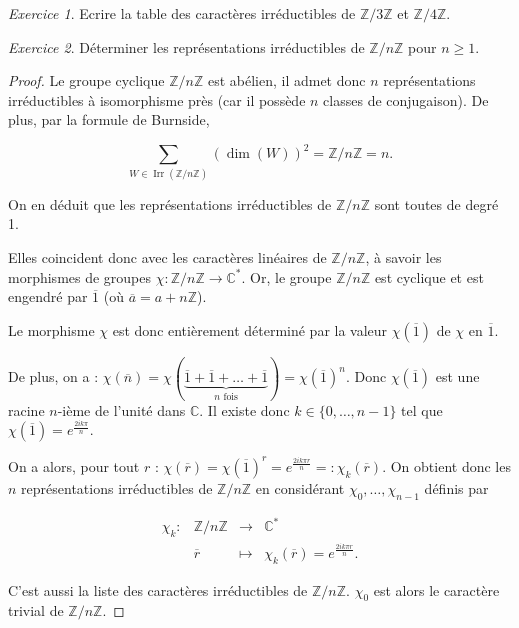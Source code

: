 \documentclass[french]{book}
\theoremstyle{definition}
\theoremstyle{remark}
\newtheorem{exo}{Exercice}
\begin{document}
\begin{exo}
  Ecrire la table des caractères irréductibles de \(\mathbb{Z}/{ 3 }\mathbb{Z}\) et \(\mathbb{Z}/{ 4 }\mathbb{Z}\).
\end{exo}

\begin{exo}
  Déterminer les représentations irréductibles de \(\mathbb{Z}/{n}\mathbb{Z}\) pour \(n \geq 1\).
\end{exo}

\begin{proof}
  Le groupe cyclique \(\mathbb{Z}/{ n }\mathbb{Z}\) est abélien, il admet donc \(n\) représentations irréductibles à isomorphisme près (car il possède \(n\) classes de conjugaison). De plus, par la formule de Burnside,

  \[\sum_{W \in \operatorname{Irr}(\mathbb{Z}/{ n }\mathbb{Z})} (\operatorname{dim}(W)) ^2 = \mathbb{Z}/{ n }\mathbb{Z} = n.\]

  On en déduit que les représentations irréductibles de \(\mathbb{Z}/{ n }\mathbb{Z}\) sont toutes de degré 1.

  Elles coincident donc avec les caractères linéaires de \(\mathbb{Z}/{n}\mathbb{Z}\), à savoir les morphismes de groupes \(\chi : \mathbb{Z}/{ n }\mathbb{Z} \longrightarrow \mathbb{C} ^{*}\). Or, le groupe \(\mathbb{Z}/{n}\mathbb{Z}\) est cyclique et est engendré par \(\overline{1}\) (où \(\overline{a} = a + n \mathbb{Z}\)).

  Le morphisme \(\chi\) est donc entièrement déterminé par la valeur \(\chi(\overline{1})\) de \(\chi\) en \(\overline{1}\).

  De plus, on a : \(\chi(\overline{n}) = \chi(\underbrace{\overline{1} + \overline{1} + \dots + \overline{1}}_{n \text{ fois}}) = \chi(\overline{1})^{n}\). Donc \(\chi(\overline{1})\) est une racine \(n\)-ième de l'unité dans \(\mathbb{C}\). Il existe donc \(k \in \{ 0, \dots, n-1 \} \) tel que \(\chi(\overline{1}) = e^{\frac{2 i k \pi}{n}}\).

  On a alors, pour tout \(r\) : \(\chi(\overline{r}) = \chi(\overline{1}) ^{r} = e^{\frac{2 i k \pi r}{n}}=: \chi_k(\overline{r})\). On obtient donc les \(n\) représentations irréductibles de \(\mathbb{Z}/{n}\mathbb{Z}\) en considérant \(\chi_0, \dots, \chi _{n-1}\) définis par

  \[\begin{matrix}
  \chi_k : & \mathbb{Z}/{n}\mathbb{Z} & \longrightarrow & \mathbb{C}^{*} \\
  \ & \overline{r}  & \longmapsto & \chi_k(\overline{r}) = e^{\frac{2 i k \pi r}{n}}.
  \end{matrix}\]

  C'est aussi la liste des caractères irréductibles de \(\mathbb{Z}/{n}\mathbb{Z}\). \(\chi_0\) est alors le caractère trivial de \(\mathbb{Z}/{n}\mathbb{Z}\).
\end{proof}
\end{document}
